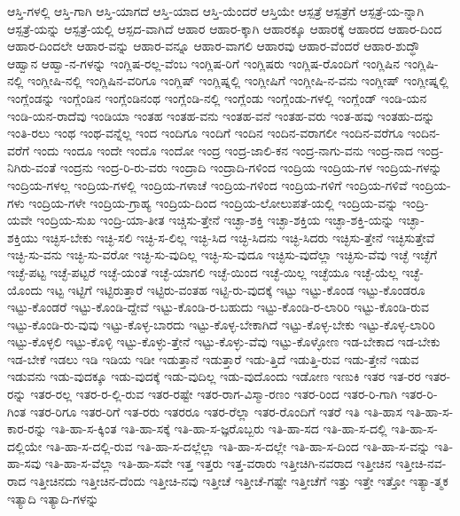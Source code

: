 {ಆಸ್ತಿ-ಗಳಲ್ಲಿ
ಆಸ್ತಿ-ಗಾಗಿ
ಆಸ್ತಿ-ಯಾಗದೆ
ಆಸ್ತಿ-ಯಾದ
ಆಸ್ತಿ-ಯೆಂದರೆ
ಆಸ್ತಿಯೇ
ಆಸ್ಪತ್ರೆ
ಆಸ್ಪತ್ರೆಗೆ
ಆಸ್ಪತ್ರೆ-ಯ-ನ್ನಾಗಿ
ಆಸ್ಪತ್ರೆ-ಯನ್ನು
ಆಸ್ಪತ್ರೆ-ಯಲ್ಲಿ
ಆಸ್ಪದ-ವಾಗಿದೆ
ಆಹಾರ
ಆಹಾರ-ಕ್ಕಾಗಿ
ಆಹಾರಕ್ಕೂ
ಆಹಾರಕ್ಕೆ
ಆಹಾರದ
ಆಹಾರ-ದಿಂದ
ಆಹಾರ-ದಿಂದಲೇ
ಆಹಾರ-ವನ್ನು
ಆಹಾರ-ವನ್ನೂ
ಆಹಾರ-ವಾಗಲಿ
ಆಹಾರವು
ಆಹಾರ-ವೆಂದರೆ
ಆಹಾರ-ಶುದ್ಧೌ
ಆಹ್ವಾನ
ಆಹ್ವಾ-ನ-ಗಳನ್ನು
ಇಂಗ್ಲಿಷ-ರಲ್ಲ-ವೆಂಬ
ಇಂಗ್ಲಿಷ-ರಿಗೆ
ಇಂಗ್ಲಿಷರು
ಇಂಗ್ಲಿಷ-ರೊಂದಿಗೆ
ಇಂಗ್ಲಿಷಿನ
ಇಂಗ್ಲಿಷಿ-ನಲ್ಲಿ
ಇಂಗ್ಲೀಷಿ-ನಲ್ಲಿ
ಇಂಗ್ಲಿಷಿನ-ವರಿಗೂ
ಇಂಗ್ಲಿಷ್
ಇಂಗ್ಲಿಷ್ನಲ್ಲಿ
ಇಂಗ್ಲೀಷಿಗೆ
ಇಂಗ್ಲೀಷಿ-ನ-ವನು
ಇಂಗ್ಲೀಷ್
ಇಂಗ್ಲೀಷ್ನಲ್ಲಿ
ಇಂಗ್ಲೆಂಡನ್ನು
ಇಂಗ್ಲೆಂಡಿನ
ಇಂಗ್ಲೆಂಡಿನಂಥ
ಇಂಗ್ಲೆಂಡಿ-ನಲ್ಲಿ
ಇಂಗ್ಲೆಂಡು
ಇಂಗ್ಲೆಂಡು-ಗಳಲ್ಲಿ
ಇಂಗ್ಲೆಂಡ್
ಇಂಡಿ-ಯನ
ಇಂಡಿ-ಯನ-ರಾದೆವು
ಇಂಡಿಯಾ
ಇಂತಹ
ಇಂತಹ-ವನು
ಇಂತಹ-ವನೆ
ಇಂತಹ-ವರು
ಇಂತ-ಹವು
ಇಂತಹು-ದನ್ನು
ಇಂತಿ-ರಲು
ಇಂಥ
ಇಂಥ-ವನ್ನೆಲ್ಲ
ಇಂದ
ಇಂದಿಗೂ
ಇಂದಿಗೆ
ಇಂದಿನ
ಇಂದಿನ-ವರಾಗಲೀ
ಇಂದಿನ-ವರೆಗೂ
ಇಂದಿನ-ವರೆಗೆ
ಇಂದು
ಇಂದೂ
ಇಂದೇ
ಇಂದೊ
ಇಂದೋ
ಇಂದ್ರ
ಇಂದ್ರ-ಜಾಲಿ-ಕನ
ಇಂದ್ರ-ನಾಗು-ವನು
ಇಂದ್ರ-ನಾದ
ಇಂದ್ರ-ನಿಗಿರು-ವಂತೆ
ಇಂದ್ರನು
ಇಂದ್ರ-ರಿ-ರು-ವರು
ಇಂದ್ರಾದಿ
ಇಂದ್ರಾದಿ-ಗಳಿಂದ
ಇಂದ್ರಿಯ
ಇಂದ್ರಿಯ-ಗಳ
ಇಂದ್ರಿಯ-ಗಳನ್ನು
ಇಂದ್ರಿಯ-ಗಳಲ್ಲ
ಇಂದ್ರಿಯ-ಗಳಲ್ಲಿ
ಇಂದ್ರಿಯ-ಗಳಾಚೆ
ಇಂದ್ರಿಯ-ಗಳಿಂದ
ಇಂದ್ರಿಯ-ಗಳಿಗೆ
ಇಂದ್ರಿಯ-ಗಳಿವೆ
ಇಂದ್ರಿಯ-ಗಳು
ಇಂದ್ರಿಯ-ಗಳೇ
ಇಂದ್ರಿಯ-ಗ್ರಾಹ್ಯ
ಇಂದ್ರಿಯ-ದಿಂದ
ಇಂದ್ರಿಯ-ಲೋಲುಪತೆ-ಯಲ್ಲಿ
ಇಂದ್ರಿಯ-ವನ್ನು
ಇಂದ್ರಿ-ಯವೇ
ಇಂದ್ರಿಯ-ಸುಖ
ಇಂದ್ರಿ-ಯಾ-ತೀತ
ಇಚ್ಚಿಸು-ತ್ತೇನೆ
ಇಚ್ಛಾ-ಶಕ್ತಿ
ಇಚ್ಛಾ-ಶಕ್ತಿಯ
ಇಚ್ಛಾ-ಶಕ್ತಿ-ಯನ್ನು
ಇಚ್ಛಾ-ಶಕ್ತಿಯು
ಇಚ್ಛಿಸ-ಬೇಕು
ಇಚ್ಛಿ-ಸಲಿ
ಇಚ್ಛಿ-ಸ-ಲಿಲ್ಲ
ಇಚ್ಛಿ-ಸಿದ
ಇಚ್ಛಿ-ಸಿದನು
ಇಚ್ಛಿ-ಸಿದರು
ಇಚ್ಛಿಸು-ತ್ತೇನೆ
ಇಚ್ಛಿಸುತ್ತೇವೆ
ಇಚ್ಛಿ-ಸು-ವನು
ಇಚ್ಛಿ-ಸು-ವರೋ
ಇಚ್ಛಿ-ಸು-ವುದಿಲ್ಲ
ಇಚ್ಛಿ-ಸು-ವುದೂ
ಇಚ್ಛಿಸು-ವುದೆಲ್ಲಾ
ಇಚ್ಛಿಸು-ವೆವು
ಇಚ್ಛೆ
ಇಚ್ಛೆಗೆ
ಇಚ್ಛೆ-ಪಟ್ಟ
ಇಚ್ಛೆ-ಪಟ್ಟರೆ
ಇಚ್ಛೆ-ಯಂತೆ
ಇಚ್ಛೆ-ಯಾಗಲಿ
ಇಚ್ಛೆ-ಯಿಂದ
ಇಚ್ಛೆ-ಯಿಲ್ಲ
ಇಚ್ಛೆಯೂ
ಇಚ್ಛೆ-ಯೆಲ್ಲ
ಇಚ್ಛೆ-ಯೊಂದು
ಇಟ್ಟ
ಇಟ್ಟಿಗೆ
ಇಟ್ಟಿರುತ್ತಾರೆ
ಇಟ್ಟಿರು-ವಂತಹ
ಇಟ್ಟಿ-ರು-ವುದಕ್ಕೆ
ಇಟ್ಟು
ಇಟ್ಟು-ಕೊಂಡ
ಇಟ್ಟು-ಕೊಂಡರೂ
ಇಟ್ಟು-ಕೊಂಡರೆ
ಇಟ್ಟು-ಕೊಂಡಿ-ದ್ದೇವೆ
ಇಟ್ಟು-ಕೊಂಡಿ-ರ-ಬಹುದು
ಇಟ್ಟು-ಕೊಂಡಿ-ರ-ಲಾರಿರಿ
ಇಟ್ಟು-ಕೊಂಡಿ-ರುವ
ಇಟ್ಟು-ಕೊಂಡಿ-ರು-ವುವು
ಇಟ್ಟು-ಕೊಳ್ಳ-ಬಾರದು
ಇಟ್ಟು-ಕೊಳ್ಳ-ಬೇಕಾಗಿದೆ
ಇಟ್ಟು-ಕೊಳ್ಳ-ಬೇಕು
ಇಟ್ಟು-ಕೊಳ್ಳ-ಲಾರಿರಿ
ಇಟ್ಟು-ಕೊಳ್ಳಲಿ
ಇಟ್ಟು-ಕೊಳ್ಳಿ
ಇಟ್ಟು-ಕೊಳ್ಳು-ತ್ತೇನೆ
ಇಟ್ಟು-ಕೊಳ್ಳು-ವೆವು
ಇಟ್ಟು-ಕೊಳ್ಳೋಣ
ಇಡ-ಬೇಕಾದ
ಇಡ-ಬೇಕು
ಇಡ-ಬೇಕೆ
ಇಡಲು
ಇಡಿ
ಇಡಿಯ
ಇಡೀ
ಇಡುತ್ತಾನೆ
ಇಡುತ್ತಾರೆ
ಇಡು-ತ್ತಿದೆ
ಇಡುತ್ತಿ-ರುವ
ಇಡು-ತ್ತೇನೆ
ಇಡುವ
ಇಡುವನು
ಇಡು-ವುದಕ್ಕೂ
ಇಡು-ವುದಕ್ಕೆ
ಇಡು-ವುದಿಲ್ಲ
ಇಡು-ವುದೊಂದು
ಇಡೋಣ
ಇಣುಕಿ
ಇತರ
ಇತ-ರರ
ಇತರ-ರನ್ನು
ಇತರ-ರಲ್ಲ
ಇತರ-ರ-ಲ್ಲಿ-ರುವ
ಇತರ-ರಷ್ಟೇ
ಇತರ-ರಾಗ-ವಿಸ್ಮಾ-ರಣಂ
ಇತರ-ರಿಂದ
ಇತರ-ರಿ-ಗಾಗಿ
ಇತರ-ರಿ-ಗಿಂತ
ಇತರ-ರಿಗೂ
ಇತರ-ರಿಗೆ
ಇತ-ರರು
ಇತರರೂ
ಇತರ-ರೆಲ್ಲಾ
ಇತರ-ರೊಂದಿಗೆ
ಇತರೆ
ಇತಿ
ಇತಿ-ಹಾಸ
ಇತಿ-ಹಾ-ಸ-ಕಾರ-ರನ್ನು
ಇತಿ-ಹಾ-ಸ-ಕ್ಕಿಂತ
ಇತಿ-ಹಾ-ಸಕ್ಕೆ
ಇತಿ-ಹಾ-ಸ-ಜ್ಞರೊಬ್ಬರು
ಇತಿ-ಹಾ-ಸದ
ಇತಿ-ಹಾ-ಸ-ದಲ್ಲಿ
ಇತಿ-ಹಾ-ಸ-ದಲ್ಲಿಯೇ
ಇತಿ-ಹಾ-ಸ-ದಲ್ಲಿ-ರುವ
ಇತಿ-ಹಾ-ಸ-ದಲ್ಲೆಲ್ಲಾ
ಇತಿ-ಹಾ-ಸ-ದಲ್ಲೇ
ಇತಿ-ಹಾ-ಸ-ದಿಂದ
ಇತಿ-ಹಾ-ಸ-ವನ್ನು
ಇತಿ-ಹಾ-ಸವು
ಇತಿ-ಹಾ-ಸ-ವೆಲ್ಲಾ
ಇತಿ-ಹಾ-ಸವೇ
ಇತ್ತ
ಇತ್ತರು
ಇತ್ತ-ವರಾರು
ಇತ್ತೀಚಿಗಿ-ನವರಾದ
ಇತ್ತೀಚಿನ
ಇತ್ತೀಚಿ-ನವ-ರಾದ
ಇತ್ತೀಚಿನದು
ಇತ್ತೀಚಿನ-ದೆಂದು
ಇತ್ತೀಚಿ-ನವು
ಇತ್ತೀಚೆ
ಇತ್ತೀಚೆ-ಗಷ್ಟೇ
ಇತ್ತೀಚೆಗೆ
ಇತ್ತು
ಇತ್ತೇ
ಇತ್ತೋ
ಇತ್ಯಾ-ತ್ಮಕ
ಇತ್ಯಾದಿ
ಇತ್ಯಾದಿ-ಗಳನ್ನು
}
